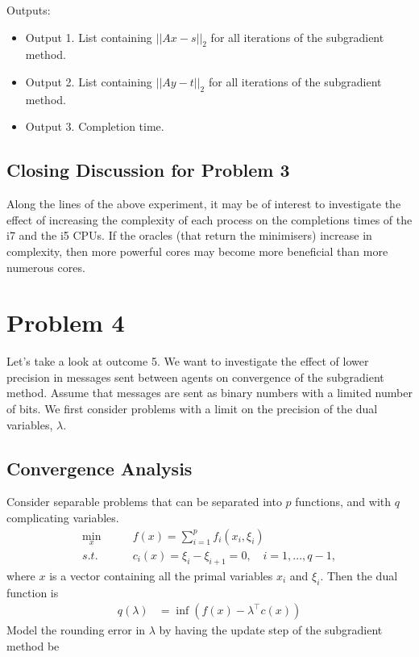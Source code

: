 \documentclass[12pt]{article}
\begin{document}
Outputs:
\begin{itemize}
	\item Output 1. List containing $||Ax-s||_2$ for all iterations of the subgradient method.
	\item Output 2. List containing $||Ay-t||_2$ for all iterations of the subgradient method.
	\item Output 3. Completion time.
\end{itemize}

\subsection*{Closing Discussion for Problem 3}

Along the lines of the above experiment, it may be of interest to investigate the effect of increasing the complexity of each process on the completions times of the i7 and the i5 CPUs. If the oracles (that return the minimisers) increase in complexity, then more powerful cores may become more beneficial than more numerous cores.

\section*{Problem 4}

Let's take a look at outcome 5. We want to investigate the effect of lower precision in messages sent between agents on convergence of the subgradient method. Assume that messages are sent as binary numbers with a limited number of bits. We first consider problems with a limit on the precision of the dual variables, $\lambda$.

\subsection*{Convergence Analysis}

Consider separable problems that can be separated into $p$ functions, and with $q$ complicating variables.
\begin{align*}
\min_x\qquad& f(x)=\sum\limits_{i=1}^{p}f_i(x_i,\xi_i)\\
s.t.\qquad&c_i(x)=\xi_i-\xi_{i+1}=0,\quad i=1,...,q-1,
\end{align*}
where $x$ is a vector containing all the primal variables $x_i$ and $\xi_i$. Then the dual function is
\begin{align*}
q(\lambda)&=\inf(f(x)-\lambda^\top c(x))
\end{align*}
Model the rounding error in $\lambda$ by having the update step of the subgradient method be
\end{document}
